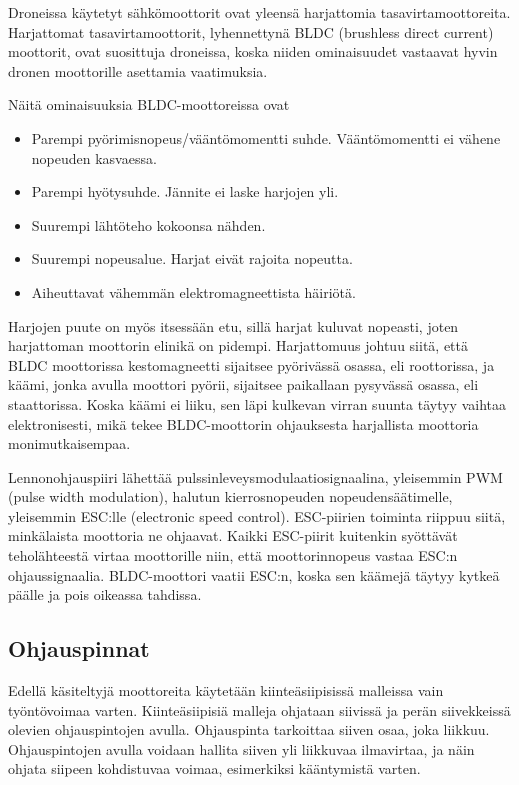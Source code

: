 Droneissa käytetyt sähkömoottorit ovat yleensä harjattomia
tasavirtamoottoreita. Harjattomat tasavirtamoottorit, lyhennettynä BLDC
(brushless direct current) moottorit, ovat suosittuja droneissa, koska niiden
ominaisuudet vastaavat hyvin dronen moottorille asettamia
vaatimuksia.~\cite{Gabriel2011}

Näitä ominaisuuksia BLDC-moottoreissa ovat~\cite{Yedamale2003}
\begin{itemize}
  \item Parempi pyörimisnopeus/vääntömomentti suhde. Vääntömomentti ei vähene
    nopeuden kasvaessa.

  \item Parempi hyötysuhde. Jännite ei laske harjojen yli.

  \item Suurempi lähtöteho kokoonsa nähden.

  \item Suurempi nopeusalue. Harjat eivät rajoita nopeutta.

  \item Aiheuttavat vähemmän elektromagneettista häiriötä.

\end{itemize}

Harjojen puute on myös itsessään etu, sillä harjat kuluvat nopeasti, joten
harjattoman moottorin elinikä on pidempi. Harjattomuus johtuu siitä, että
BLDC moottorissa kestomagneetti sijaitsee pyörivässä osassa, eli roottorissa,
ja käämi, jonka avulla moottori pyörii, sijaitsee paikallaan pysyvässä
osassa, eli staattorissa. Koska käämi ei liiku, sen läpi kulkevan
virran suunta täytyy vaihtaa elektronisesti, mikä tekee BLDC-moottorin
ohjauksesta harjallista moottoria monimutkaisempaa.~\cite{Gabriel2011}

Lennonohjauspiiri lähettää pulssinleveysmodulaatiosignaalina, yleisemmin PWM
(pulse width modulation), halutun kierrosnopeuden nopeudensäätimelle,
yleisemmin ESC:lle (electronic speed control). ESC-piirien toiminta riippuu
siitä, minkälaista moottoria ne ohjaavat. Kaikki ESC-piirit kuitenkin syöttävät
teholähteestä virtaa moottorille niin, että moottorinnopeus vastaa ESC:n
ohjaussignaalia. BLDC-moottori vaatii ESC:n, koska sen käämejä täytyy kytkeä
päälle ja pois oikeassa tahdissa.~\cite{Gabriel2011}


\subsection{Ohjauspinnat}
Edellä käsiteltyjä moottoreita käytetään kiinteäsiipisissä malleissa vain
työntövoimaa varten. Kiinteäsiipisiä malleja ohjataan siivissä ja perän
siivekkeissä olevien ohjauspintojen avulla. Ohjauspinta tarkoittaa siiven osaa,
joka liikkuu. Ohjauspintojen avulla voidaan hallita siiven yli liikkuvaa
ilmavirtaa, ja näin ohjata siipeen kohdistuvaa voimaa, esimerkiksi kääntymistä
varten.

